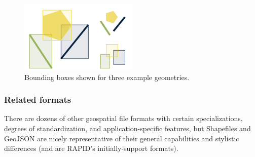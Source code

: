 \begin{figure}
    \centering
    \includegraphics[width=0.5\textwidth]{figures/bbox.png}
    \caption{Bounding boxes shown for three example geometries.}
    \label{fig:bbox}
\end{figure}

\subsubsection{Related formats}
There are dozens of other geospatial file formats with certain specializations, degrees of standardization, and application-specific features, but Shapefiles and GeoJSON are nicely representative of their general capabilities and stylistic differences (and are RAPID's initially-support formats).